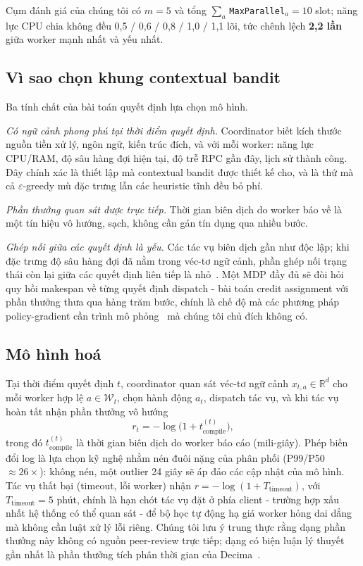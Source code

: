 \documentclass[final,5p,times,twocolumn]{elsarticle}
\begin{document}
Cụm đánh giá của chúng tôi có $m=5$ và tổng $\sum_a$\,\texttt{MaxParallel}$_a=10$ slot; năng lực CPU chia không đều 0,5 / 0,6 / 0,8 / 1,0 / 1,1 lõi, tức chênh lệch \textbf{2,2 lần} giữa worker mạnh nhất và yếu nhất.

\subsection{Vì sao chọn khung contextual bandit}

Ba tính chất của bài toán quyết định lựa chọn mô hình.

\emph{Có ngữ cảnh phong phú tại thời điểm quyết định.} Coordinator biết kích thước nguồn tiền xử lý, ngôn ngữ, kiến trúc đích, và với mỗi worker: năng lực CPU/RAM, độ sâu hàng đợi hiện tại, độ trễ RPC gần đây, lịch sử thành công. Đây chính xác là thiết lập mà contextual bandit được thiết kế cho, và là thứ mà cả $\varepsilon$-greedy mù đặc trưng lẫn các heuristic tĩnh đều bỏ phí.

\emph{Phần thưởng quan sát được trực tiếp.} Thời gian biên dịch do worker báo về là một tín hiệu vô hướng, sạch, không cần gán tín dụng qua nhiều bước.

\emph{Ghép nối giữa các quyết định là yếu.} Các tác vụ biên dịch gần như độc lập; khi đặc trưng độ sâu hàng đợi đã nằm trong véc-tơ ngữ cảnh, phần ghép nối trạng thái còn lại giữa các quyết định liên tiếp là nhỏ~\cite{slivkins2019}. Một MDP đầy đủ sẽ đòi hỏi quy hồi makespan về từng quyết định dispatch - bài toán credit assignment với phần thưởng thưa qua hàng trăm bước, chính là chế độ mà các phương pháp policy-gradient cần trình mô phỏng~\cite{deeprm,decima} mà chúng tôi chủ đích không có.

\subsection{Mô hình hoá}

Tại thời điểm quyết định $t$, coordinator quan sát véc-tơ ngữ cảnh $x_{t,a}\in\mathbb{R}^d$ cho mỗi worker hợp lệ $a\in\mathcal{W}_t$, chọn hành động $a_t$, dispatch tác vụ, và khi tác vụ hoàn tất nhận phần thưởng vô hướng
\begin{equation}
r_t=-\log\bigl(1+t_{\text{compile}}^{(t)}\bigr),
\end{equation}
trong đó $t_{\text{compile}}^{(t)}$ là thời gian biên dịch do worker báo cáo (mili-giây). Phép biến đổi log là lựa chọn kỹ nghệ nhằm nén đuôi nặng của phân phối (P99/P50 $\approx26\times$): không nén, một outlier 24 giây sẽ áp đảo các cập nhật của mô hình. Tác vụ thất bại (timeout, lỗi worker) nhận $r=-\log(1+T_{\text{timeout}})$, với $T_{\text{timeout}}=5$ phút, chính là hạn chót tác vụ đặt ở phía client - trường hợp xấu nhất hệ thống có thể quan sát - để bộ học tự động hạ giá worker hỏng dai dẳng mà không cần luật xử lý lỗi riêng. Chúng tôi lưu ý trung thực rằng dạng phần thưởng này không có nguồn peer-review trực tiếp; dạng có biện luận lý thuyết gần nhất là phần thưởng tích phân thời gian của Decima~\cite{decima}.
\end{document}
